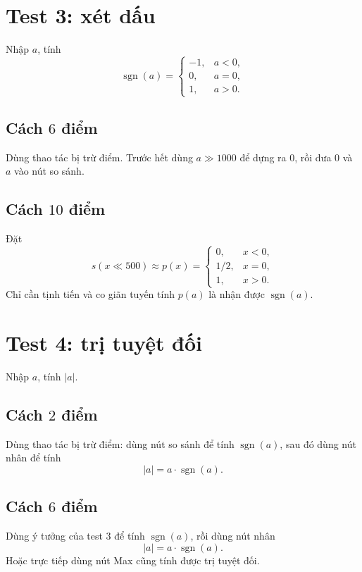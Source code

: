 \documentclass[11pt]{article}
\begin{document}
\section{Test 3: xét dấu}

Nhập $a$, tính
\[
  \operatorname{sgn}(a)=
  \begin{cases}
    -1, & a<0,\\
    0, & a=0,\\
    1, & a>0.
  \end{cases}
\]

\subsection*{Cách $6$ điểm}

Dùng thao tác bị trừ điểm. Trước hết dùng $a\gg 1000$ để dựng ra $0$, rồi đưa
$0$ và $a$ vào nút so sánh.

\subsection*{Cách $10$ điểm}

Đặt
\[
  s(x\ll 500)\approx p(x)=
  \begin{cases}
    0, & x<0,\\
    1/2, & x=0,\\
    1, & x>0.
  \end{cases}
\]
Chỉ cần tịnh tiến và co giãn tuyến tính $p(a)$ là nhận được
$\operatorname{sgn}(a)$.

\section{Test 4: trị tuyệt đối}

Nhập $a$, tính $\lvert a\rvert$.

\subsection*{Cách $2$ điểm}

Dùng thao tác bị trừ điểm: dùng nút so sánh để tính
$\operatorname{sgn}(a)$, sau đó dùng nút nhân để tính
\[
  \lvert a\rvert=a\cdot \operatorname{sgn}(a).
\]

\subsection*{Cách $6$ điểm}

Dùng ý tưởng của test 3 để tính $\operatorname{sgn}(a)$, rồi dùng nút nhân
\[
  \lvert a\rvert=a\cdot \operatorname{sgn}(a).
\]
Hoặc trực tiếp dùng nút Max cũng tính được trị tuyệt đối.
\end{document}
